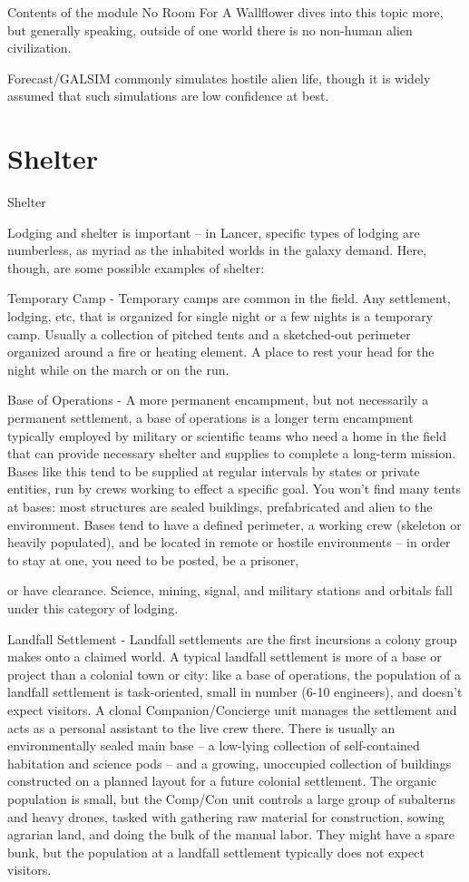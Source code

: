 Contents of the module No Room For A Wallflower dives into this topic more, but generally
speaking, outside of one world there is no non-human alien civilization.


Forecast/GALSIM commonly simulates hostile alien life, though it is widely assumed that such
simulations are low confidence at best.

\section{Shelter}
Shelter

Lodging and shelter is important -- in Lancer, specific types of lodging are numberless, as myriad
as the inhabited worlds in the galaxy demand. Here, though, are some possible examples of
shelter:


Temporary Camp - Temporary camps are common in the field. Any settlement, lodging, etc, that
is organized for single night or a few nights is a temporary camp. Usually a collection of pitched
tents and a sketched-out perimeter organized around a fire or heating element. A place to rest
your head for the night while on the march or on the run.


Base of Operations - A more permanent encampment, but not necessarily a permanent
settlement, a base of operations is a longer term encampment typically employed by military or
scientific teams who need a home in the field that can provide necessary shelter and supplies to
complete a long-term mission. Bases like this tend to be supplied at regular intervals by states or
private entities, run by crews working to effect a specific goal. You won’t find many tents at
bases: most structures are sealed buildings, prefabricated and alien to the environment. Bases
tend to have a defined perimeter, a working crew (skeleton or heavily populated), and be located
in remote or hostile environments -- in order to stay at one, you need to be posted, be a prisoner,




or have clearance. Science, mining, signal, and military stations and orbitals fall under this
category of lodging.


Landfall Settlement - Landfall settlements are the first incursions a colony group makes onto a
claimed world. A typical landfall settlement is more of a base or project than a colonial town or
city: like a base of operations, the population of a landfall settlement is task-oriented, small in
number (6-10 engineers), and doesn’t expect visitors. A clonal Companion/Concierge unit
manages the settlement and acts as a personal assistant to the live crew there. There is usually
an environmentally sealed main base -- a low-lying collection of self-contained habitation and
science pods -- and a growing, unoccupied collection of buildings constructed on a planned
layout for a future colonial settlement. The organic population is small, but the Comp/Con unit
controls a large group of subalterns and heavy drones, tasked with gathering raw material for
construction, sowing agrarian land, and doing the bulk of the manual labor. They might have a
spare bunk, but the population at a landfall settlement typically does not expect visitors.


